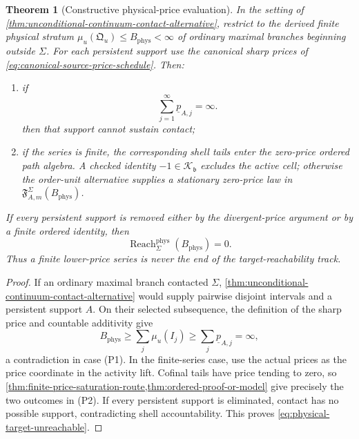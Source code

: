 \documentclass[11pt]{article}
\numberwithin{section}{part}
\theoremstyle{plain}
\newtheorem{theorem}{Theorem}[section]
\theoremstyle{definition}
\theoremstyle{remark}
\newcommand{\Reach}{\operatorname{Reach}}
\newcommand{\Phys}{\mathrm{phys}}
\newcommand{\Budget}{B_{\Phys}}
\begin{document}
\begin{theorem}[Constructive physical-price evaluation]
\label{thm:physical-saturated-accountability}
In the setting of
\cref{thm:unconditional-continuum-contact-alternative}, restrict to the
derived finite physical stratum
\(\mu_u(\mathfrak Q_u)\le\Budget<\infty\) of ordinary maximal branches
beginning outside \(\Sigma\).  For each persistent support use the canonical
sharp prices of \eqref{eq:canonical-source-price-schedule}.  Then:
\begin{enumerate}[label=\textup{(P\arabic*)}]
\item if
\begin{equation}
 \label{eq:persistent-source-physical-price}
 \sum_{j=1}^{\infty}\underline p_{A,j}=\infty.
\end{equation}
then that support cannot sustain contact;
\item if the series is finite, the corresponding shell tails enter the
zero-price ordered path algebra.  A checked identity
\(-1\in\mathcal K_{\mathfrak b}\) excludes the active cell; otherwise the order-unit
alternative supplies a stationary zero-price law in
\(\mathfrak F_{A,m}^{\Sigma}(\Budget)\).
\end{enumerate}
If every persistent support is removed either by the divergent-price argument
or by a finite ordered identity, then
\begin{equation}
 \label{eq:physical-target-unreachable}
 \boxed{\Reach^{\Phys}_\Sigma(\Budget)=0.}
\end{equation}
Thus a finite lower-price series is never the end of the target-reachability
track.
\end{theorem}

\begin{proof}
If an ordinary maximal branch contacted \(\Sigma\),
\cref{thm:unconditional-continuum-contact-alternative} would supply pairwise
disjoint intervals and a persistent support \(A\).  On their selected
subsequence, the definition of the sharp price and countable additivity give
\[
 \Budget\ge\sum_j\mu_u(I_j)
 \ge\sum_j\underline p_{A,j}=\infty,
\]
a contradiction in case \textup{(P1)}.  In the finite-series case, use the
actual prices as the price coordinate in the activity lift.  Cofinal tails
have price tending to zero, so
\cref{thm:finite-price-saturation-route,thm:ordered-proof-or-model}
give precisely the two outcomes in \textup{(P2)}.  If every persistent support
is eliminated, contact has no possible support, contradicting shell
accountability.  This proves \eqref{eq:physical-target-unreachable}.
\end{proof}
\end{document}
